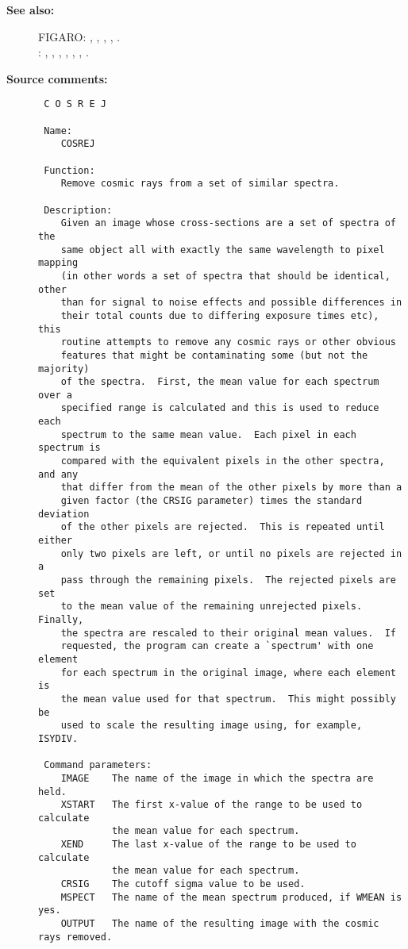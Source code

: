\begin{description}
\item [{\bf See also:}]
FIGARO: , , , , .\\
: , , , , , , .\\

\item [{\bf Source comments:}]
\begin{verbatim}
 C O S R E J

 Name:
    COSREJ

 Function:
    Remove cosmic rays from a set of similar spectra.

 Description:
    Given an image whose cross-sections are a set of spectra of the
    same object all with exactly the same wavelength to pixel mapping
    (in other words a set of spectra that should be identical, other
    than for signal to noise effects and possible differences in
    their total counts due to differing exposure times etc), this
    routine attempts to remove any cosmic rays or other obvious
    features that might be contaminating some (but not the majority)
    of the spectra.  First, the mean value for each spectrum over a
    specified range is calculated and this is used to reduce each
    spectrum to the same mean value.  Each pixel in each spectrum is
    compared with the equivalent pixels in the other spectra, and any
    that differ from the mean of the other pixels by more than a
    given factor (the CRSIG parameter) times the standard deviation
    of the other pixels are rejected.  This is repeated until either
    only two pixels are left, or until no pixels are rejected in a
    pass through the remaining pixels.  The rejected pixels are set
    to the mean value of the remaining unrejected pixels.  Finally,
    the spectra are rescaled to their original mean values.  If
    requested, the program can create a `spectrum' with one element
    for each spectrum in the original image, where each element is
    the mean value used for that spectrum.  This might possibly be
    used to scale the resulting image using, for example, ISYDIV.

 Command parameters:
    IMAGE    The name of the image in which the spectra are held.
    XSTART   The first x-value of the range to be used to calculate
             the mean value for each spectrum.
    XEND     The last x-value of the range to be used to calculate
             the mean value for each spectrum.
    CRSIG    The cutoff sigma value to be used.
    MSPECT   The name of the mean spectrum produced, if WMEAN is yes.
    OUTPUT   The name of the resulting image with the cosmic rays removed.


\end{verbatim}
\end{description}
